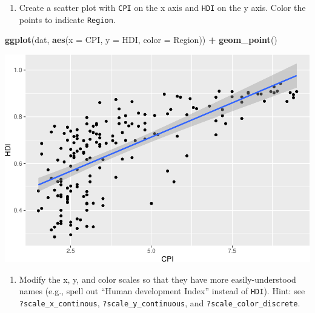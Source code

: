\documentclass[
]{book}
\newenvironment{Shaded}{\begin{snugshade}}{\end{snugshade}}
\newcommand{\DataTypeTok}[1]{\textcolor[rgb]{0.13,0.29,0.53}{#1}}
\newcommand{\KeywordTok}[1]{\textcolor[rgb]{0.13,0.29,0.53}{\textbf{#1}}}
\newcommand{\NormalTok}[1]{#1}
\newcommand{\OperatorTok}[1]{\textcolor[rgb]{0.81,0.36,0.00}{\textbf{#1}}}
\newcommand{\StringTok}[1]{\textcolor[rgb]{0.31,0.60,0.02}{#1}}
\providecommand{\tightlist}{%
  \setlength{\itemsep}{0pt}\setlength{\parskip}{0pt}}
\begin{document}
\begin{alert}

\begin{enumerate}
\def\labelenumi{\arabic{enumi}.}
\tightlist
\item
  Create a scatter plot with \texttt{CPI} on the x axis and \texttt{HDI} on the y axis. Color the points to indicate \texttt{Region}.
\end{enumerate}

\begin{Shaded}
\begin{Highlighting}[]
\KeywordTok{ggplot}\NormalTok{(dat, }\KeywordTok{aes}\NormalTok{(}\DataTypeTok{x =}\NormalTok{ CPI, }\DataTypeTok{y =}\NormalTok{ HDI, }\DataTypeTok{color =}\NormalTok{ Region)) }\OperatorTok{+}
\StringTok{  }\KeywordTok{geom\_point}\NormalTok{()}
\end{Highlighting}
\end{Shaded}

\includegraphics{R/Rgraphics/figures/unnamed-chunk-205-1.pdf}

\begin{enumerate}
\def\labelenumi{\arabic{enumi}.}
\setcounter{enumi}{1}
\tightlist
\item
  Modify the x, y, and color scales so that they have more easily-understood names (e.g., spell out ``Human development Index'' instead of \texttt{HDI}). Hint: see \texttt{?scale\_x\_continous}, \texttt{?scale\_y\_continuous}, and \texttt{?scale\_color\_discrete}.
\end{enumerate}


\end{alert}
\end{document}
